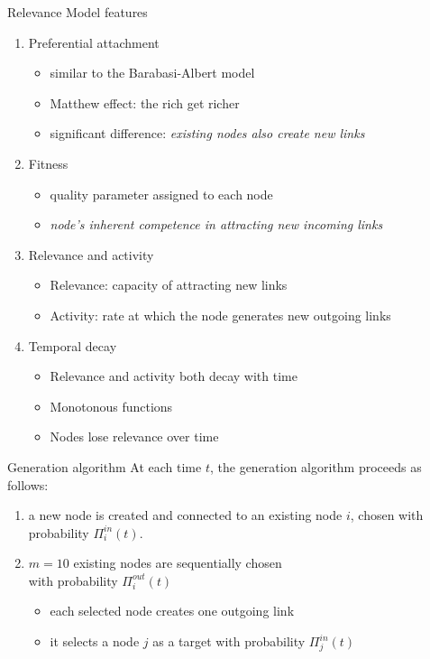 \documentclass[utf8]{beamer}
\begin{document}
\begin{frame}{Relevance Model features}
    \begin{enumerate}
        \item Preferential attachment
        \begin{itemize}
            \item similar to the Barabasi-Albert model
            \item Matthew effect: the rich get richer
            \item significant difference: \emph{existing nodes also create new links}
        \end{itemize}

        \item Fitness
        \begin{itemize}
            \item quality parameter assigned to each node
            \item \emph{node’s inherent competence in attracting new incoming links}
        \end{itemize}

        \item Relevance and activity
        \begin{itemize}
            \item Relevance: capacity of attracting new links
            \item Activity: rate at which the node generates new outgoing links
        \end{itemize}

        \item Temporal decay
        \begin{itemize}
            \item Relevance and activity both decay with time
            \item Monotonous functions
            \item Nodes lose relevance over time
        \end{itemize}
    \end{enumerate}
\end{frame}

\begin{frame}{Generation algorithm}
    At each time $t$, the generation algorithm proceeds as follows:
    \begin{enumerate}
        \item a new node is created and connected to an existing node $i$, chosen with probability $\Pi_i^{in}(t)$.
        \item $m=10$ existing nodes are sequentially chosen \\ with probability $\Pi_i^{out}(t)$
        \begin{itemize}
            \item each selected node creates one outgoing link
            \item it selects a node $j$ as a target with probability $\Pi_j^{in}(t)$
        \end{itemize}
    \end{enumerate}
\end{frame}
\end{document}
